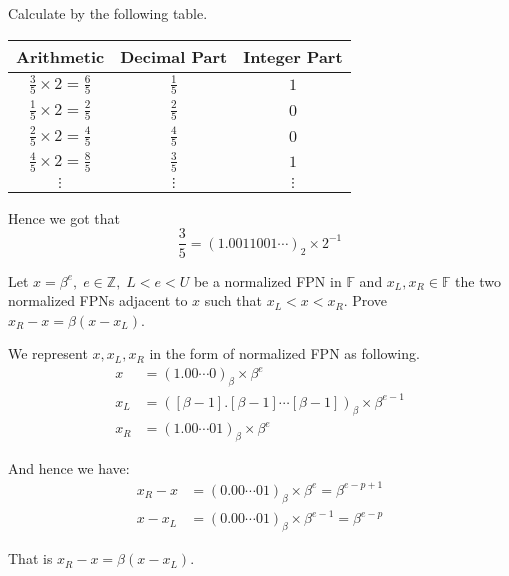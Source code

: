 \documentclass[11pt]{elegantbook}
\begin{document}
\begin{solution}
  Calculate by the following table.
  \begin{table}[H]
    \centering
    \begin{tabular}{ccc}
    Arithmetic                        & Decimal Part  & Integer Part \\ \hline
    $\frac{3}{5}\times 2=\frac{6}{5}$ & $\frac{1}{5}$ & $1$          \\
    $\frac{1}{5}\times 2=\frac{2}{5}$ & $\frac{2}{5}$ & $0$          \\
    $\frac{2}{5}\times 2=\frac{4}{5}$ & $\frac{4}{5}$ & $0$          \\
    $\frac{4}{5}\times 2=\frac{8}{5}$ & $\frac{3}{5}$ & $1$          \\
    $\vdots$                          & $\vdots$      & $\vdots$    
    \end{tabular}
  \end{table}

  Hence we got that
  \begin{equation*}
    \frac{3}{5}=(1.0011001\cdots)_2\times 2^{-1}
  \end{equation*}
\end{solution}

\vspace{1em}

\begin{problem}
  Let $x=\beta^e,\;e\in\mathbb{Z},\;L<e<U$ be a normalized FPN in $\mathbb{F}$ and $x_L,x_R\in \mathbb{F}$ the two normalized FPNs adjacent to $x$ such that $x_L<x<x_R$. Prove $x_R-x=\beta(x-x_L)$.
\end{problem}

\begin{solution}
  We represent $x,x_L,x_R$ in the form of normalized FPN as following.
  \begin{align*}
    x&=(1.00\cdots 0)_\beta \times \beta^{e}\\
    x_L&=([\beta-1].[\beta-1]\cdots [\beta-1])_\beta \times \beta^{e-1}\\
    x_R&=(1.00\cdots 01)_\beta \times \beta^{e}
  \end{align*}

  And hence we have:
  \begin{align*}
    x_R-x&=(0.00\cdots 01)_\beta\times \beta^{e}=\beta^{e-p+1}\\
    x-x_L&=(0.00\cdots 01)_\beta\times \beta^{e-1}=\beta^{e-p}
  \end{align*}

  That is $x_R-x=\beta(x-x_L)$.
\end{solution}
\end{document}

